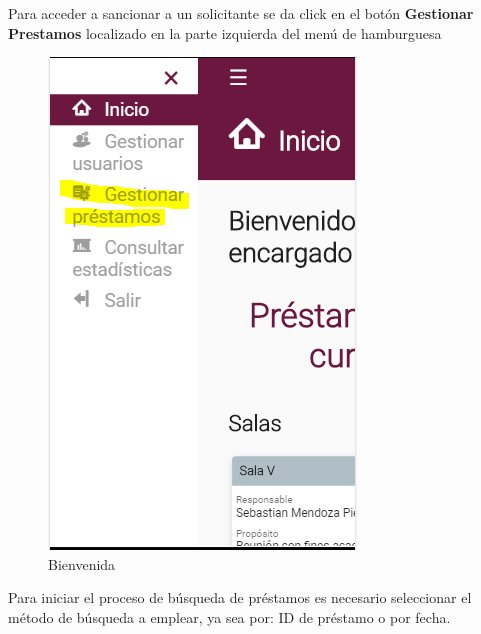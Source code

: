 Para acceder a sancionar a un solicitante se da click en el botón
	 \textbf{Gestionar Prestamos} localizado en la parte izquierda del menú de 
	 hamburguesa 
	
	\begin{figure}[hbtp]

	\includegraphics[scale=0.3]{images/InterfazMovil/IUGS07_bienvenida.PNG}
	\caption{Bienvenida}
	\end{figure}
Para iniciar el proceso de búsqueda de préstamos es necesario seleccionar el método de 
búsqueda a emplear, ya sea por: ID de préstamo o por fecha.


